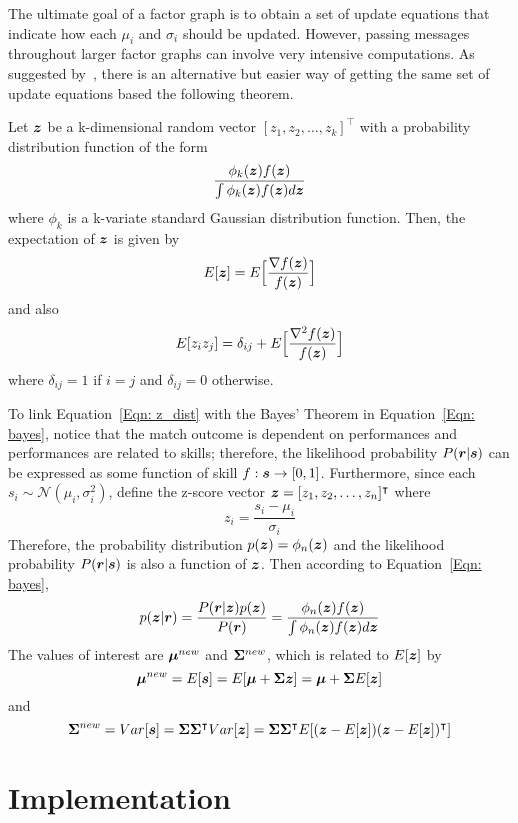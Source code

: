 The ultimate goal of a factor graph is to obtain a set of update equations that indicate how each $\mu_{i}$ and $\sigma_{i}$ should be updated. However, passing messages throughout larger factor graphs can involve very intensive computations. As suggested by~\cite{RC11}, there is an alternative but easier way of getting the same set of update equations based the following theorem. 
\begin{theorem}
Let $\bm{z}$ be a k-dimensional random vector $[z_{1}, z_{2}, \ldots, z_{k}]^{\intercal}$ with a probability distribution function of the form
\begin{equation}\label{Eqn: z_dist}
\frac{\phi_{k}(\bm{z})f(\bm{z})}{\int \phi_{k}(\bm{z})f(\bm{z})d\bm{z}}
\end{equation}
where $\phi_{k}$ is a k-variate standard Gaussian distribution function. Then, the expectation of $\bm{z}$ is given by
\begin{equation}
E[\bm{z}] = E\Big{[}\frac{\nabla f(\bm{z})}{f(\bm{z})}\Big{]}
\end{equation}
and also
\begin{equation}
E[z_{i}z_{j}] = \delta_{ij} + E\Big{[}\frac{\nabla^{2} f(\bm{z})}{f(\bm{z})}\Big{]}
\end{equation}
where $\delta_{ij} = 1$ if $i = j$ and $\delta_{ij} = 0$ otherwise. 
\end{theorem}

To link Equation~\ref{Eqn: z_dist} with the Bayes' Theorem in Equation~\ref{Eqn: bayes}, notice that the match outcome is dependent on performances and performances are related to skills; therefore, the likelihood probability $P(\bm{r} | \bm{s})$ can be expressed as some function of skill $f : \bm{s} \rightarrow [0, 1]$. Furthermore, since each $s_{i} \sim \mathcal{N}(\mu_{i}, \sigma_{i}^{2})$, define the z-score vector $\bm{z} = [z_{1}, z_{2}, \ldots, z_{n}]^{\intercal}$ where 
\begin{equation}
z_{i} = \frac{s_{i} - \mu_{i}}{\sigma_{i}} 
\end{equation}
Therefore, the probability distribution $p(\bm{z}) = \phi_{n}(\bm{z})$ and the likelihood probability $P(\bm{r} | \bm{s})$ is also a function of $\bm{z}$. Then according to Equation~\ref{Eqn: bayes}, 
\begin{equation}
p(\bm{z} | \bm{r}) = \frac{P(\bm{r} | \bm{z})p(\bm{z})}{P(\bm{r})} = \frac{\phi_{n}(\bm{z})f(\bm{z})}{\int \phi_{n}(\bm{z})f(\bm{z})d\bm{z}}
\end{equation}
The values of interest are $\bm{\mu}^{new}$ and $\bm{\Sigma}^{new}$, which is related to $E[\bm{z}]$ by
\begin{equation}
\bm{\mu}^{new} = E[\bm{s}] = E[\bm{\mu} + \bm{\Sigma}\bm{z}] = \bm{\mu} + \bm{\Sigma}E[\bm{z}]
\end{equation}
and
\begin{equation}
\bm{\Sigma}^{new} = Var[\bm{s}] = \bm{\Sigma}\bm{\Sigma}^{\intercal}Var[\bm{z}] = \bm{\Sigma}\bm{\Sigma}^{\intercal}E[(\bm{z} - E[\bm{z}])(\bm{z} - E[\bm{z}])^{\intercal}]
\end{equation}

\section{Implementation}\label{Sec: imp}